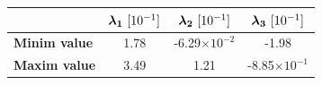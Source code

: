 \documentclass[usenatbib]{latex/mn2e}
\begin{document}


\begin{flushleft}
\begin{table}
\begin{center}

  \begin{tabular}{l | c c c} \hline
	& $\boldsymbol{ \lambda_{1} }\ [10^{-1}]$ & $\boldsymbol{ \lambda_{2} }\ [10^{-1}]$  & $\boldsymbol{ \lambda_{3} }\ [10^{-1}]$ \\ \hline
	\textbf{Minim value} & 1.78 & -6.29$\times 10^{-2}$ & -1.98 \\
	\textbf{Maxim value} & 3.49 & 1.21 & -8.85$\times 10^{-1}$ \\ \hline
  \end{tabular}
  
  
  \label{Tab:Lambdas_LG}
  
\end{center}
\end{table}
\end{flushleft}
\end{document}
